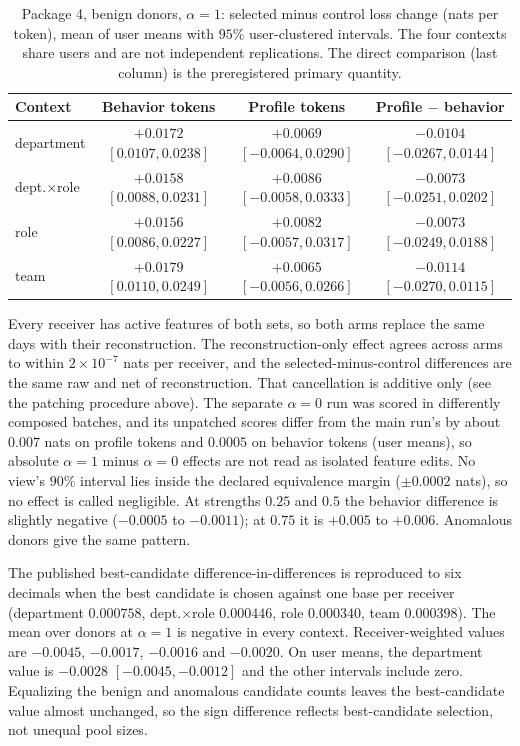 \documentclass[10pt]{article} %
\begin{document}
\begin{table}[h]
\centering
\small
\caption{Package 4, benign donors, $\alpha{=}1$: selected minus control
loss change (nats per token), mean of user means with $95\%$ user-clustered
intervals. The four contexts share users and are not independent
replications. The direct comparison (last column) is the preregistered
primary quantity.}
\label{tab:pkg4}
\begin{tabular}{lccc}
\toprule
Context & Behavior tokens & Profile tokens & Profile $-$ behavior \\
\midrule
department & $+0.0172$ $[0.0107, 0.0238]$ & $+0.0069$ $[-0.0064, 0.0290]$ & $-0.0104$ $[-0.0267, 0.0144]$ \\
dept.$\times$role & $+0.0158$ $[0.0088, 0.0231]$ & $+0.0086$ $[-0.0058, 0.0333]$ & $-0.0073$ $[-0.0251, 0.0202]$ \\
role & $+0.0156$ $[0.0086, 0.0227]$ & $+0.0082$ $[-0.0057, 0.0317]$ & $-0.0073$ $[-0.0249, 0.0188]$ \\
team & $+0.0179$ $[0.0110, 0.0249]$ & $+0.0065$ $[-0.0056, 0.0266]$ & $-0.0114$ $[-0.0270, 0.0115]$ \\
\bottomrule
\end{tabular}
\end{table}

Every receiver has active features of both sets, so both arms replace the
same days with their reconstruction. The reconstruction-only effect agrees
across arms to within $2\times10^{-7}$ nats per receiver, and the
selected-minus-control differences are the same raw and net of
reconstruction. That cancellation is additive only (see the patching procedure above). The
separate $\alpha{=}0$ run was scored in differently composed batches, and its
unpatched scores differ from the main run's by about $0.007$ nats on profile
tokens and $0.0005$ on behavior tokens (user means), so absolute
$\alpha{=}1$ minus $\alpha{=}0$ effects are not read as isolated feature
edits. No view's $90\%$ interval lies inside the declared equivalence margin
($\pm0.0002$ nats), so no effect is called negligible. At strengths $0.25$ and
$0.5$ the behavior difference is slightly negative ($-0.0005$ to $-0.0011$);
at $0.75$ it is $+0.005$ to $+0.006$. Anomalous donors give the same pattern.

The published best-candidate difference-in-differences is reproduced to six
decimals when the best candidate is chosen against one base per receiver
(department $0.000758$, dept.$\times$role $0.000446$, role $0.000340$, team
$0.000398$). The mean over donors at $\alpha{=}1$ is negative in every
context. Receiver-weighted values are $-0.0045$, $-0.0017$, $-0.0016$ and
$-0.0020$. On user means, the department value is $-0.0028$
$[-0.0045, -0.0012]$ and the other intervals include zero. Equalizing the
benign and anomalous candidate counts leaves the best-candidate value almost
unchanged, so the sign difference reflects best-candidate selection, not
unequal pool sizes.
\end{document}
